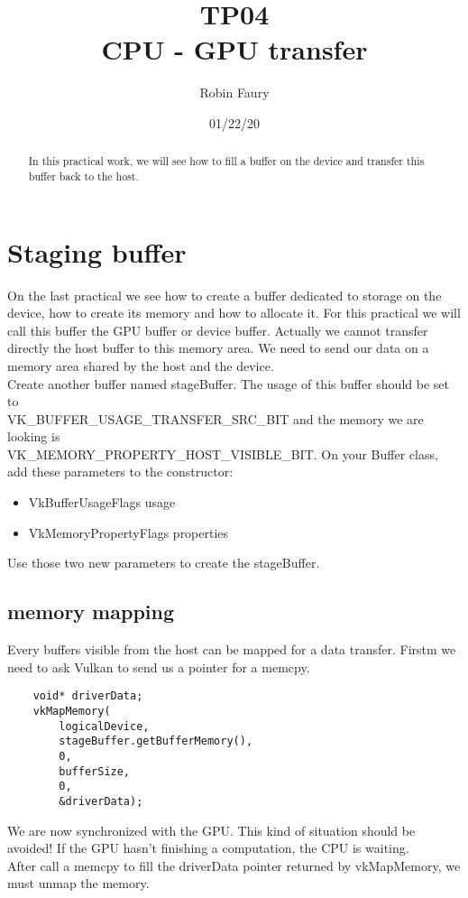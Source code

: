 \documentclass{article}
\begin{document}
\title{TP04\\CPU - GPU transfer}
\author{Robin Faury}
\date{01/22/20}
\maketitle

\begin{abstract}
	In this practical work, we will see how to fill a buffer on the device and transfer this buffer back to the host.
\end{abstract}

\section{Staging buffer}
On the last practical we see how to create a buffer dedicated to storage on the device, how to create its memory and how to allocate it. For this practical we will call this buffer the GPU buffer or device buffer. Actually we cannot transfer directly the host buffer to this memory area. We need to send our data on a memory area shared by the host and the device.\\
Create another buffer named stageBuffer. The usage of this buffer should be set to \\VK\_BUFFER\_USAGE\_TRANSFER\_SRC\_BIT and the memory we are looking is \\VK\_MEMORY\_PROPERTY\_HOST\_VISIBLE\_BIT. On your Buffer class, add these parameters to the constructor:
\begin{itemize}
	\item VkBufferUsageFlags usage
	\item VkMemoryPropertyFlags properties
\end{itemize}
Use those two new parameters to create the stageBuffer.

\subsection{memory mapping}
Every buffers visible from the host can be mapped for a data transfer. Firstm we need to ask Vulkan to send us a pointer for a memcpy. 

\begin{lstlisting}
	void* driverData;
	vkMapMemory(
		logicalDevice,
		stageBuffer.getBufferMemory(),
		0,
		bufferSize,
		0,
		&driverData);
\end{lstlisting}

We are now synchronized with the GPU. This kind of situation should be avoided! If the GPU hasn't finishing a computation, the CPU is waiting.\\
After call a memcpy to fill the driverData pointer returned by vkMapMemory, we must unmap the memory.
\end{document}
